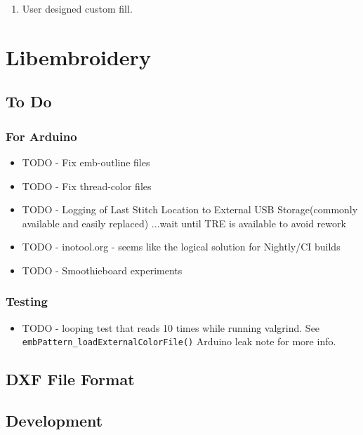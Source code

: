 \documentclass{report}
\begin{document}
\begin{enumerate}
\item User designed custom fill.
\end{enumerate}

\chapter{Libembroidery}

\section{To Do}

\subsection{For Arduino}

\begin{itemize}
\item TODO - Fix emb-outline files
\item TODO - Fix thread-color files
\item TODO - Logging of Last Stitch Location to External USB Storage(commonly available and easily replaced) ...wait until TRE is available to avoid rework
\item TODO - inotool.org - seems like the logical solution for Nightly/CI builds
\item TODO - Smoothieboard experiments
\end{itemize}

\subsection{Testing}

\begin{itemize}
\item TODO - looping test that reads 10 times while running valgrind. See \texttt{embPattern\_loadExternalColorFile()} Arduino leak note for more info.
\end{itemize}

\section{DXF File Format}

\cite{dxf_reference}

\section{Development}
\end{document}
